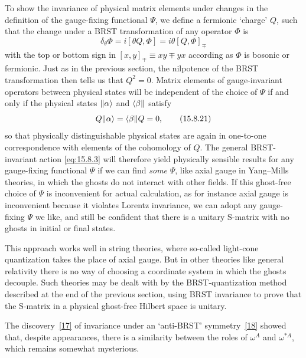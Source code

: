 To show the invariance of physical matrix elements under changes in the definition of the gauge-fixing functional $\Psi$, we define a fermionic `charge' $Q$, such that the change under a BRST transformation of any operator $\Phi$ is
\begin{equation}
 \delta_\theta\Phi=i[\theta Q,\Phi]=i\theta[Q,\Phi]_{\mp}
 \tag{15.8.20}\label{eq:15.8.20}
\end{equation}
with the top or bottom sign in $[x,y]_{\mp}\equiv xy\mp yx$ according as $\Phi$ is bosonic or fermionic. Just as in the previous section, the nilpotence of the BRST transformation then tells us that $Q^2=0$. Matrix elements of gauge-invariant operators between physical states will be independent of the choice of $\Psi$ if and only if the physical states $\lVert \alpha\rangle$ and $\langle \beta\rVert$ satisfy
\begin{equation}
 Q\lVert \alpha\rangle=\langle \beta\rVert Q=0,
 \tag{15.8.21}\label{eq:15.8.21}
\end{equation}
so that physically distinguishable physical states are again in one-to-one correspondence with elements of the cohomology of $Q$. The general BRST-invariant action \eqref{eq:15.8.3} will therefore yield physically sensible results for any gauge-fixing functional $\Psi$ if we can find \emph{some} $\Psi$, like axial gauge in Yang--Mills theories, in which the ghosts do not interact with other fields. If this ghost-free choice of $\Psi$ is inconvenient for actual calculation, as for instance axial gauge is inconvenient because it violates Lorentz invariance, we can adopt any gauge-fixing $\Psi$ we like, and still be confident that there is a unitary S-matrix with no ghosts in initial or final states.

This approach works well in string theories, where so-called light-cone quantization takes the place of axial gauge. But in other theories like general relativity there is no way of choosing a coordinate system in which the ghosts decouple. Such theories may be dealt with by the BRST-quantization method described at the end of the previous section, using BRST invariance to prove that the S-matrix in a physical ghost-free Hilbert space is unitary.

The discovery~\hyperref[ch15-ref-17]{[17]} of invariance under an `anti-BRST' symmetry~\hyperref[ch15-ref-18]{[18]} showed that, despite appearances, there is a similarity between the roles of $\omega^A$ and $\omega^{*A}$, which remains somewhat mysterious.

